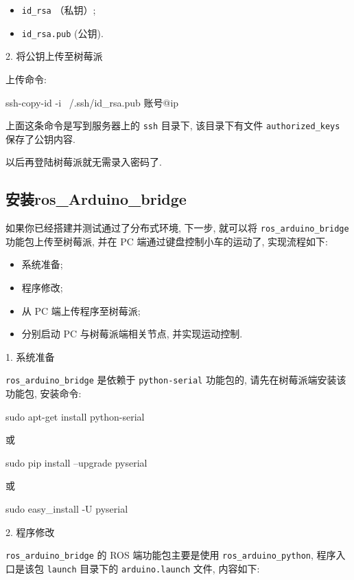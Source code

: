 \documentclass[openany, fontset=windowsold]{ctexbook}
\theoremstyle{kaiti}
\theoremstyle{normal}
\begin{document}
\begin{itemize}
  \item \verb|id_rsa| （私钥）;
  \item \verb|id_rsa.pub| (公钥).
\end{itemize}

2. 将公钥上传至树莓派

上传命令:

\begin{bash}
  ssh-copy-id -i ~/.ssh/id_rsa.pub 账号@ip
\end{bash}

上面这条命令是写到服务器上的 \verb|ssh| 目录下, 该目录下有文件 \verb|authorized_keys| 保存了公钥内容.

以后再登陆树莓派就无需录入密码了.

\subsection{安装ros\_Arduino\_bridge}

如果你已经搭建并测试通过了分布式环境, 下一步, 就可以将 \verb|ros_arduino_bridge| 功能包上传至树莓派, 并在 PC 端通过键盘控制小车的运动了, 实现流程如下:

\begin{itemize}
  \item 系统准备; 
  \item 程序修改; 
  \item 从 PC 端上传程序至树莓派; 
  \item 分别启动 PC 与树莓派端相关节点, 并实现运动控制.
\end{itemize}

1. 系统准备

\verb|ros_arduino_bridge| 是依赖于 \verb|python-serial| 功能包的, 请先在树莓派端安装该功能包, 安装命令:

\begin{bash}
  sudo apt-get install python-serial
\end{bash}

或

\begin{bash}
  sudo pip install --upgrade pyserial
\end{bash}

或

\begin{bash}
  sudo easy_install -U pyserial
\end{bash}

2. 程序修改

\verb|ros_arduino_bridge| 的 ROS 端功能包主要是使用 \verb|ros_arduino_python|, 程序入口是该包 \verb|launch| 目录下的 \verb|arduino.launch| 文件, 内容如下:
\end{document}
